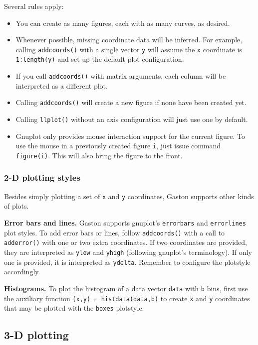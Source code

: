 \documentclass[11pt]{article}
\newcommand{\cmd}[1]{\texttt{#1}}
\begin{document}
Several rules apply:
\begin{itemize}
	\item You can create as many figures, each with as many curves, as desired.
	\item Whenever possible, missing coordinate data will be inferred. For
		example, calling \cmd{addcoords()} with a single vector \cmd{y}
		will assume the \cmd{x} coordinate is \cmd{1:length(y)} and set up the
		default plot configuration.
	\item If you call \cmd{addcoords()} with matrix arguments, each column will
		be interpreted as a different plot.
	\item Calling \cmd{addcoords()} will create a new figure if none have been
		created yet.
	\item Calling \cmd{llplot()} without an axis configuration will just use one
		by default.
	\item Gnuplot only provides mouse interaction support for the current
		figure. To use the mouse in a previously created figure \cmd{i}, just
		issue command \cmd{figure(i)}. This will also bring the figure to the
		front.
\end{itemize}

\subsubsection{2-D plotting styles}

Besides simply plotting a set of \cmd{x} and \cmd{y} coordinates, Gaston
supports other kinds of plots.

\textbf{Error bars and lines.} Gaston supports gnuplot's \cmd{errorbars} and
\cmd{errorlines} plot styles. To add error bars or lines, follow
\cmd{addcoords()} with a call to \cmd{adderror()} with one or two extra
coordinates. If two coordinates are provided, they are interpreted as \cmd{ylow}
and \cmd{yhigh} (following gnuplot's terminology). If only one is provided, it
is interpreted as \cmd{ydelta}. Remember to configure the plotstyle
accordingly.

\textbf{Histograms.} To plot the histogram of a data vector \cmd{data} with
\cmd{b} bins, first use the auxiliary function \cmd{(x,y) = histdata(data,b)}
to create \cmd{x} and \cmd{y} coordinates that may be plotted with the
\cmd{boxes} plotstyle.

\subsection{3-D plotting}
\end{document}
